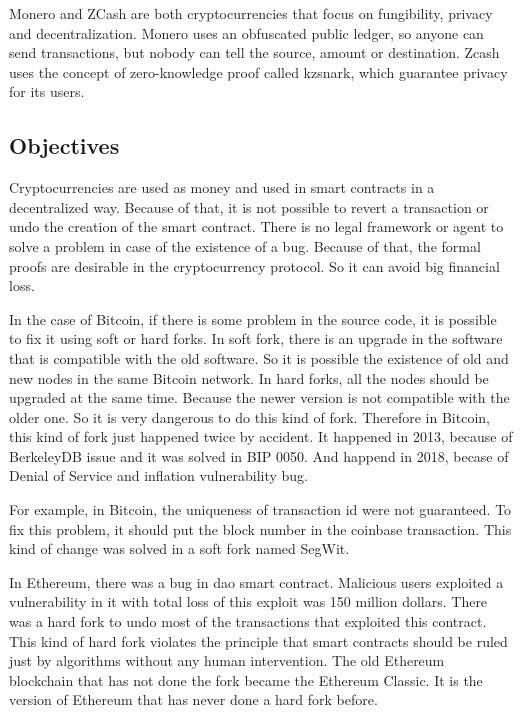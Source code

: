 Monero and ZCash are both cryptocurrencies that focus on fungibility, privacy and decentralization.
Monero uses an obfuscated public ledger, so anyone can send transactions,
but nobody can tell the source, amount or destination.
Zcash uses the concept of zero-knowledge proof called \gls{kzsnark},
which guarantee privacy for its users.

\subsection{Objectives}

Cryptocurrencies are used as money and used in smart contracts in a decentralized way.
Because of that, it is not possible to revert a transaction or undo the creation of the smart contract.
There is no legal framework or agent to solve a problem in case of the existence of a bug.
Because of that, the formal proofs are desirable in the cryptocurrency protocol.
So it can avoid big financial loss.

In the case of Bitcoin, if there is some problem in the source code,
it is possible to fix it using soft or hard forks.
In soft fork, there is an upgrade in the software that is compatible with the old software.
So it is possible the existence of old and new nodes in the same Bitcoin network.
In hard forks, all the nodes should be upgraded at the same time.
Because the newer version is not compatible with the older one.
So it is very dangerous to do this kind of fork.
Therefore in Bitcoin, this kind of fork just happened twice by accident.
It happened in 2013, because of BerkeleyDB issue and it was solved in BIP 0050.
And happend in 2018, becase of Denial of Service and inflation vulnerability bug.

For example, in Bitcoin, the uniqueness of transaction \gls{id} were not guaranteed.
To fix this problem, it should put the block number in the coinbase transaction.
This kind of change was solved in a soft fork named SegWit.

In Ethereum, there was a bug in \gls{dao} smart contract.
Malicious users exploited a vulnerability in it with
total loss of this exploit was 150 million dollars.
There was a hard fork to undo most of the transactions that exploited this contract.
This kind of hard fork violates the principle that smart contracts should be ruled just by
algorithms without any human intervention.
The old Ethereum blockchain that has not done the fork became the Ethereum Classic.
It is the version of Ethereum that has never done a hard fork before.

